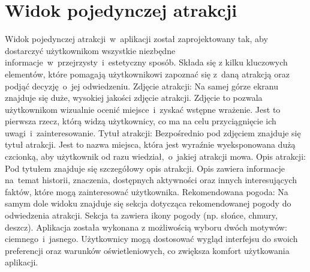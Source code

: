 \section{Widok pojedynczej atrakcji}
\label{sec:atrakcjawidok}
Widok pojedynczej atrakcji~w~aplikacji został zaprojektowany tak, aby dostarczyć
użytkownikom wszystkie niezbędne informacje~w~przejrzysty~i~estetyczny sposób.
Składa się z kilku kluczowych elementów, które pomagają użytkownikowi zapoznać się z~daną atrakcją oraz podjąć decyzję~o~jej odwiedzeniu.
\newline
Zdjęcie atrakcji:
Na samej górze ekranu znajduje się duże, wysokiej jakości zdjęcie atrakcji.
Zdjęcie to pozwala użytkownikom wizualnie ocenić miejsce~i~zyskać wstępne wrażenie. Jest to pierwsza rzecz, którą widzą użytkownicy, co ma na celu przyciągnięcie ich uwagi~i~zainteresowanie.
\newline
Tytuł atrakcji:
Bezpośrednio pod zdjęciem znajduje się tytuł atrakcji. Jest to nazwa miejsca, która jest
wyraźnie wyeksponowana dużą czcionką, aby użytkownik od razu wiedział,~o~jakiej atrakcji mowa.
\newline
Opis atrakcji:
Pod tytułem znajduje się szczegółowy opis atrakcji.
Opis zawiera informacje na~temat historii, znaczenia, dostępnych aktywności oraz innych interesujących faktów, które mogą
zainteresować użytkownika.
\newline
Rekomendowana pogoda:
Na samym dole widoku znajduje się sekcja dotycząca rekomendowanej
pogody do odwiedzenia atrakcji. Sekcja ta zawiera ikony pogody (np. słońce, chmury, deszcz).
\newline
Aplikacja została wykonana z możliwością wyboru dwóch motywów: ciemnego~i~jasnego.
Użytkownicy mogą dostosować wygląd interfejsu do swoich preferencji oraz warunków oświetleniowych, co zwiększa komfort użytkowania aplikacji.

